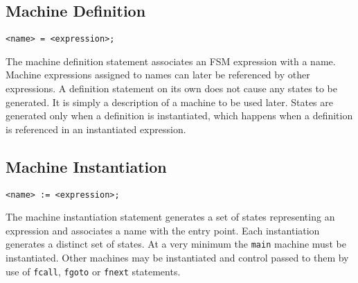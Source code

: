 \documentclass[letterpaper,11pt,oneside]{book}
\newcommand{\verbspace}{\vspace{10pt}}
\begin{document}
\subsection{Machine Definition}
\label{definition}

\begin{verbatim}
<name> = <expression>;
\end{verbatim}
\verbspace

The machine definition statement associates an FSM expression with a name.  Machine
expressions assigned to names can later be referenced by other expressions.  A
definition statement on its own does not cause any states to be generated. It is simply a
description of a machine to be used later. States are generated only when a definition is
instantiated, which happens when a definition is referenced in an instantiated
expression. 

\subsection{Machine Instantiation}
\label{instantiation}

\begin{verbatim}
<name> := <expression>;
\end{verbatim}
\verbspace

The machine instantiation statement generates a set of states representing an expression and
associates a name with the entry point. Each instantiation generates a distinct
set of states.  At a very minimum the \verb|main| machine must be instantiated.
Other machines may be instantiated and control passed to them by use of
\verb|fcall|, \verb|fgoto| or \verb|fnext| statements.

\begin{comment}
\subsection{Write Statement}

\begin{verbatim}
write <component> [options];
\end{verbatim}
\verbspace

The write statement is used to generate parts of the machine. There are four
components that can be generated: the state machine's static data, the
initialization code, the execution code and the EOF action execution code.  The
write statement is described in detail in Section \ref{write-statement}.
\end{comment}
\end{document}
